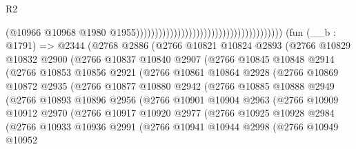 \begin{lexlean}{R2}
\begin{coremodule}
                                                                                (@10966
                                                                                  @10968
                                                                                  @1980
                                                                                  @1955)))))))))))))))))))))))))))))))))))))))
    (fun (__b : @1791) =>
    @2344
      (@2768
        @2886
        (@2766
          @10821
          @10824
          @2893
          (@2766
            @10829
            @10832
            @2900
            (@2766
              @10837
              @10840
              @2907
              (@2766
                @10845
                @10848
                @2914
                (@2766
                  @10853
                  @10856
                  @2921
                  (@2766
                    @10861
                    @10864
                    @2928
                    (@2766
                      @10869
                      @10872
                      @2935
                      (@2766
                        @10877
                        @10880
                        @2942
                        (@2766
                          @10885
                          @10888
                          @2949
                          (@2766
                            @10893
                            @10896
                            @2956
                            (@2766
                              @10901
                              @10904
                              @2963
                              (@2766
                                @10909
                                @10912
                                @2970
                                (@2766
                                  @10917
                                  @10920
                                  @2977
                                  (@2766
                                    @10925
                                    @10928
                                    @2984
                                    (@2766
                                      @10933
                                      @10936
                                      @2991
                                      (@2766
                                        @10941
                                        @10944
                                        @2998
                                        (@2766
                                          @10949
                                          @10952

\end{coremodule}
\end{lexlean}
